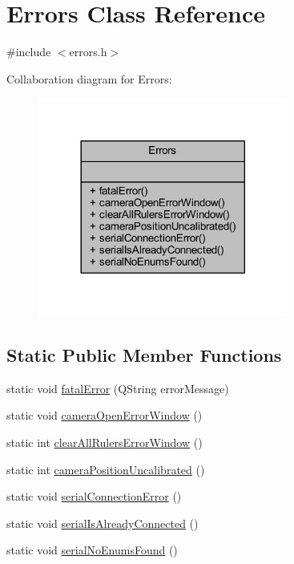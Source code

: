 \hypertarget{classErrors}{}\section{Errors Class Reference}
\label{classErrors}


{\ttfamily \#include $<$errors.\+h$>$}



Collaboration diagram for Errors\+:
\nopagebreak
\begin{figure}[H]
\begin{center}
\leavevmode
\includegraphics[width=233pt]{classErrors__coll__graph}
\end{center}
\end{figure}
\subsection*{Static Public Member Functions}
\begin{DoxyCompactItemize}
\item 
static void \mbox{\hyperlink{classErrors_afe4cb66263186b59444271e7ca44e025}{fatal\+Error}} (Q\+String error\+Message)
\item 
static void \mbox{\hyperlink{classErrors_ac17ec34c73179504a0ba63271a005d0a}{camera\+Open\+Error\+Window}} ()
\item 
static int \mbox{\hyperlink{classErrors_a1aad6f02f491d241fafa37b86dbd0c1a}{clear\+All\+Rulers\+Error\+Window}} ()
\item 
static int \mbox{\hyperlink{classErrors_a988959b35354c727ebe2fd884ee34bae}{camera\+Position\+Uncalibrated}} ()
\item 
static void \mbox{\hyperlink{classErrors_a5ed088325fbe34556ae24b8167eaf0fd}{serial\+Connection\+Error}} ()
\item 
static void \mbox{\hyperlink{classErrors_ad05246aaafe8e4e546e7b28bd2a21312}{serial\+Is\+Already\+Connected}} ()
\item 
static void \mbox{\hyperlink{classErrors_a4d1bdcbd36b5df8317a4511226c5d55a}{serial\+No\+Enums\+Found}} ()
\end{DoxyCompactItemize}


